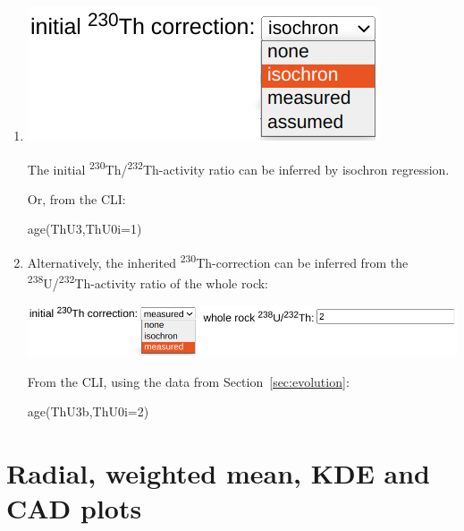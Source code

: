 \begin{refsection}
\begin{enumerate}
\begin{enumerate}
  \item\begin{minipage}[t]{.35\linewidth}
    \strut\vspace*{-\baselineskip}\newline
    \includegraphics[width=\linewidth]{../figures/ThUdetritalisochroncorr.png}
  \end{minipage}
    \begin{minipage}[t]{.65\linewidth}
      The initial
      \textsuperscript{230}Th/\textsuperscript{232}Th-activity ratio
      can be inferred by isochron regression.\\
    \end{minipage}

    Or, from the CLI:

\begin{console}
age(ThU3,ThU0i=1)
\end{console}
    
\item Alternatively, the inherited \textsuperscript{230}Th-correction
  can be inferred from the
  \textsuperscript{238}U/\textsuperscript{232}Th-activity ratio of the
  whole rock:\medskip

  \noindent\includegraphics[width=.9\linewidth]{../figures/ThUformat34initial02.png}

From the CLI, using the data from Section~\ref{sec:evolution}:
  
\begin{console}
age(ThU3b,ThU0i=2)
\end{console}

  \end{enumerate}
  
\end{enumerate}

\section{Radial, weighted mean, KDE and CAD plots}


\end{refsection}
